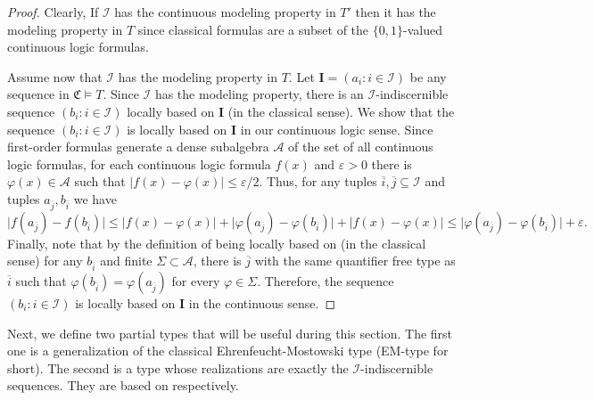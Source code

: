 \documentclass{amsart}
\newtheorem{external claim}[teor]{Claim}
\newcommand{\C}{{\mathfrak C}}
\newcommand{\I}{\mathcal{I}}
\newcommand{\II}{\mathbf{I}}
\DeclareMathOperator{\qftp}{{tp^{qf}}}
\begin{document}
\begin{proof}
    Clearly, If $\I$ has the continuous modeling property in $T'$ then it has the modeling property in $T$ since classical formulas are a subset of the $\{0,1\}$-valued continuous logic formulas.

    Assume now that $\I$ has the modeling property in $T$. Let $\II=(a_i:i\in \I)$ be any sequence in $\C\models T$. Since $\I$ has the modeling property, there is an $\I$-indiscernible sequence $(b_i:i\in \I)$ locally based on $\II$ (in the classical sense). We show that the sequence $(b_i:i\in \I)$ is locally based on $\II$ in our continuous logic sense. Since first-order formulas generate a dense subalgebra $\mathcal{A}$ of the set of all continuous logic formulas, for each continuous logic formula $f(x)$ and $\varepsilon>0$ there is $\varphi(x)\in \mathcal{A}$ such that $\lvert f(x)-\varphi(x)\rvert \leq \varepsilon/2$. Thus, for any tuples 
    $\overline{i},\overline{j}\subseteq \I$ %
    and tuples $a_{\overline{j}}, b_{\overline{i} }$ we have $$ \lvert f(a_{\overline{j}}) -f(b_{\overline{i}})\rvert \leq \lvert f(x)-\varphi(x)\rvert + \lvert \varphi(a_{\overline{j}}) -\varphi(b_{\overline{i}}) \rvert + \lvert f(x)-\varphi(x)\rvert \leq \lvert \varphi(a_{\overline{j}}) -\varphi(b_{\overline{i}}) \rvert +\varepsilon.$$
    Finally, note that by the definition of being locally based on (in the classical sense) for any $b_{\overline{i}}$ and finite $\Sigma \subset \mathcal{A}$, there is $\overline{j}$ with the same quantifier free type as $\overline{i}$ such that $ \varphi(b_{\overline{i}})=\varphi(a_{\overline{j}}) $ for every $\varphi\in \Sigma$. 
    Therefore, the sequence $(b_i:i\in \I)$ is locally based on $\II$ in the continuous sense.
\end{proof}

Next, we define two partial types that will be useful during this section. The first one is a generalization of the classical Ehrenfeucht-Mostowski type (EM-type for short). The second is a type whose realizations are exactly the $\I$-indiscernible sequences. They are based on \cite[Definitions 2.6 and 2.10]{SCOW20121624} respectively.
\end{document}
